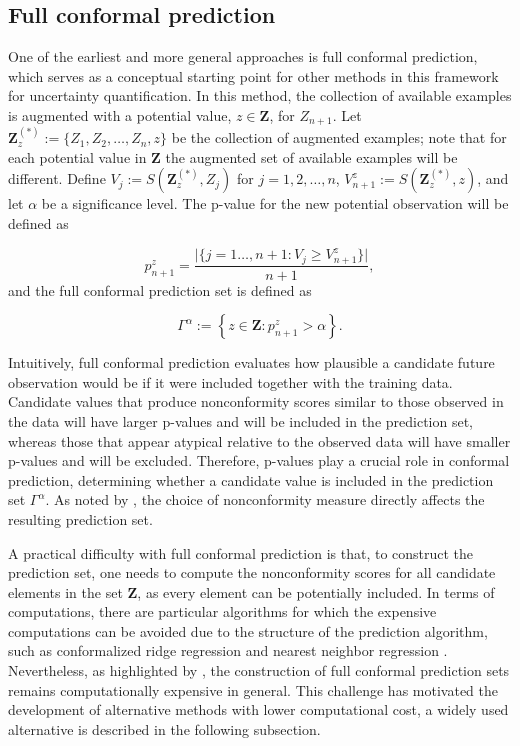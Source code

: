 \subsection{Full conformal prediction}\label{full-conformal-prediction}

One of the earliest and more general approaches is full conformal
prediction, which serves as a conceptual starting point for other
methods in this framework for uncertainty quantification. In this
method, the collection of available examples is augmented with a
potential value, \(z\in\mathbf{Z}\), for \(Z_{n+1}\). Let
\(\textbf{Z}^{(*)}_{z} := \{Z_1 , Z_2, \ldots, Z_n, z\}\) be the
collection of augmented examples; note that for each potential value in
\(\textbf{Z}\) the augmented set of available examples will be different.
Define \(V_j := S\left(\textbf{Z}^{(*)}_{z}, Z_j\right)\) for
\(j=1,2,\ldots, n\), \(V_{n+1}^{z} := S(\textbf{Z}^{(*)}_{z}, z)\), and let
\(\alpha\) be a significance level. The p-value for the new potential
observation will be defined as

\begin{equation}
p_{n+1}^{z} = \dfrac{\lvert \{j = 1\ldots, n+1: V_j \geq V_{n+1}^z\} \rvert}{n+1},
\label{eq:fcp-pvalnext}
\end{equation} and the full conformal prediction set is defined as

\begin{equation}
\Gamma^{\alpha} := \left\{ z\in \textbf{Z}: p_{n+1}^{z}>\alpha \right\}.
\label{eq:fcp-predset}
\end{equation}

Intuitively, full conformal prediction evaluates how plausible a
candidate future observation would be if it were included together with
the training data. Candidate values that produce nonconformity scores
similar to those observed in the data will have larger p-values and will
be included in the prediction set, whereas those that appear atypical
relative to the observed data will have smaller p-values and will be
excluded. Therefore, p-values play a crucial role in conformal
prediction, determining whether a candidate value is included in the
prediction set \(\Gamma^{\alpha}\). As noted by
\citet{vovk2022}, the choice of nonconformity measure
directly affects the resulting prediction set.

A practical difficulty with full conformal prediction is that, to
construct the prediction set, one needs to compute the nonconformity
scores for all candidate elements in the set \(\textbf{Z}\), as every
element can be potentially included. In terms of computations, there are
particular algorithms for which the expensive computations can be
avoided due to the structure of the prediction algorithm, such as
conformalized ridge regression and nearest neighbor regression
\citep{vovk2022}. Nevertheless, as highlighted by \citet{lei2018},
the construction of full conformal prediction sets remains
computationally expensive in general. This challenge has motivated the
development of alternative methods with lower computational cost, a
widely used alternative is described in the following subsection.

